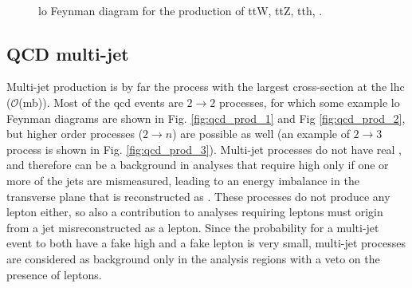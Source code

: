 \begin{figure}[h]
\centering 
{}
 \\
\caption{\Gls{lo} Feynman diagram for the production of  ttW,  ttZ,  tth,  \fourtop.}\label{fig:ttX_prod}
\end{figure}

\subsection{QCD multi-jet}

Multi-jet production is by far the process with the largest cross-section at the \gls{lhc} ($\mathcal{O}$(mb)). 
Most of the \gls{qcd} events are $2 \to 2$ processes, for which some example \gls{lo} Feynman diagrams are shown in Fig. \ref{fig:qcd_prod_1} and Fig \ref{fig:qcd_prod_2}, but higher order processes ($2 \to n$) are possible as well (an example of $2 \to 3$ process is shown in Fig. \ref{fig:qcd_prod_3}). 
Multi-jet processes do not have real \met, and therefore can be a background in analyses that require high \met only if one or more of the jets are mismeasured, leading to an energy imbalance in the transverse plane that is reconstructed as \met. 
These processes do not produce any lepton either, so also a contribution to analyses requiring leptons must origin from a jet misreconstructed as a lepton. 
Since the probability for a multi-jet event to both have a fake high \met and a fake lepton is very small, multi-jet processes are considered as background only in the analysis regions with a veto on the presence of leptons. 


